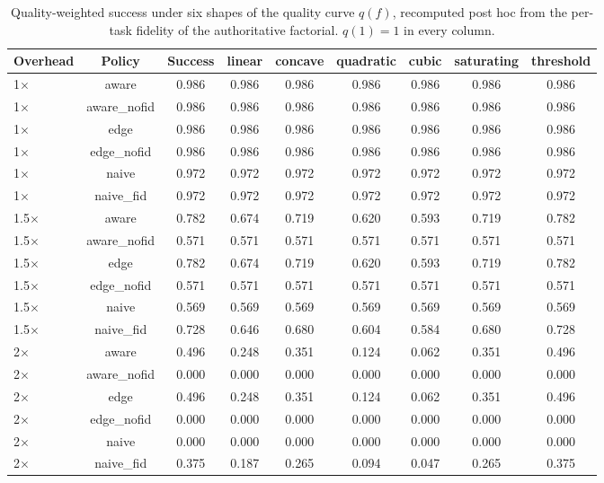 \begin{table}
\centering
\footnotesize
\caption{Quality-weighted success under six shapes of the quality curve $q(f)$, recomputed post hoc from the per-task fidelity of the authoritative factorial. $q(1)=1$ in every column.}
\label{tab:p2-quality-sensitivity}
\begin{tabular}{lcccccccc}
\toprule
Overhead & Policy & Success & linear & concave & quadratic & cubic & saturating & threshold \\
\midrule
1$\times$ & aware & 0.986 & 0.986 & 0.986 & 0.986 & 0.986 & 0.986 & 0.986 \\
1$\times$ & aware\_nofid & 0.986 & 0.986 & 0.986 & 0.986 & 0.986 & 0.986 & 0.986 \\
1$\times$ & edge & 0.986 & 0.986 & 0.986 & 0.986 & 0.986 & 0.986 & 0.986 \\
1$\times$ & edge\_nofid & 0.986 & 0.986 & 0.986 & 0.986 & 0.986 & 0.986 & 0.986 \\
1$\times$ & naive & 0.972 & 0.972 & 0.972 & 0.972 & 0.972 & 0.972 & 0.972 \\
1$\times$ & naive\_fid & 0.972 & 0.972 & 0.972 & 0.972 & 0.972 & 0.972 & 0.972 \\
1.5$\times$ & aware & 0.782 & 0.674 & 0.719 & 0.620 & 0.593 & 0.719 & 0.782 \\
1.5$\times$ & aware\_nofid & 0.571 & 0.571 & 0.571 & 0.571 & 0.571 & 0.571 & 0.571 \\
1.5$\times$ & edge & 0.782 & 0.674 & 0.719 & 0.620 & 0.593 & 0.719 & 0.782 \\
1.5$\times$ & edge\_nofid & 0.571 & 0.571 & 0.571 & 0.571 & 0.571 & 0.571 & 0.571 \\
1.5$\times$ & naive & 0.569 & 0.569 & 0.569 & 0.569 & 0.569 & 0.569 & 0.569 \\
1.5$\times$ & naive\_fid & 0.728 & 0.646 & 0.680 & 0.604 & 0.584 & 0.680 & 0.728 \\
2$\times$ & aware & 0.496 & 0.248 & 0.351 & 0.124 & 0.062 & 0.351 & 0.496 \\
2$\times$ & aware\_nofid & 0.000 & 0.000 & 0.000 & 0.000 & 0.000 & 0.000 & 0.000 \\
2$\times$ & edge & 0.496 & 0.248 & 0.351 & 0.124 & 0.062 & 0.351 & 0.496 \\
2$\times$ & edge\_nofid & 0.000 & 0.000 & 0.000 & 0.000 & 0.000 & 0.000 & 0.000 \\
2$\times$ & naive & 0.000 & 0.000 & 0.000 & 0.000 & 0.000 & 0.000 & 0.000 \\
2$\times$ & naive\_fid & 0.375 & 0.187 & 0.265 & 0.094 & 0.047 & 0.265 & 0.375 \\

\end{tabular}
\end{table}
